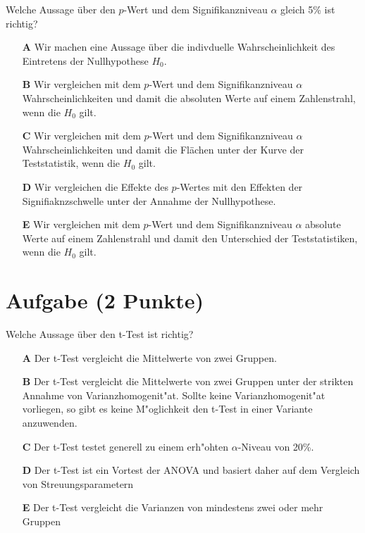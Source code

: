 \documentclass[a4paper, 10pt]{scrartcl}\usepackage[]{graphicx}\usepackage[]{color}
\begin{document}
Welche Aussage über den $p$-Wert und dem Signifikanzniveau $\alpha$ gleich 5\% ist richtig?



\begin{enumerate}
\item [\textbf{A} \msquare] Wir machen eine Aussage über die indivduelle Wahrscheinlichkeit des Eintretens der Nullhypothese $H_0$.
\item [\textbf{B} \msquare] Wir vergleichen mit dem $p$-Wert und dem Signifikanzniveau $\alpha$ Wahrscheinlichkeiten und damit die absoluten Werte auf einem Zahlenstrahl, wenn die $H_0$ gilt.
\item [\textbf{C} \msquare] Wir vergleichen mit dem $p$-Wert und dem Signifikanzniveau $\alpha$ Wahrscheinlichkeiten und damit die Flächen unter der Kurve der Teststatistik, wenn die $H_0$ gilt.
\item [\textbf{D} \msquare] Wir vergleichen die Effekte des $p$-Wertes mit den Effekten der Signifiaknzschwelle unter der Annahme der Nullhypothese.
\item [\textbf{E} \msquare] Wir vergleichen mit dem $p$-Wert und dem Signifikanzniveau $\alpha$ absolute Werte auf einem Zahlenstrahl und damit den Unterschied der Teststatistiken, wenn die $H_0$ gilt.
\end{enumerate}

\section{Aufgabe \hfill (2 Punkte)}

Welche Aussage {\"u}ber den t-Test ist richtig?



\begin{enumerate}
\item [\textbf{A} \msquare] Der t-Test vergleicht die Mittelwerte von zwei Gruppen.
\item [\textbf{B} \msquare] Der t-Test vergleicht die Mittelwerte von zwei Gruppen unter der strikten Annahme von Varianzhomogenit{"a}t. Sollte keine Varianzhomogenit{"a}t vorliegen, so gibt es keine M{"o}glichkeit den t-Test in einer Variante anzuwenden.
\item [\textbf{C} \msquare] Der t-Test testet generell zu einem erh{"o}hten $\alpha$-Niveau von 20\%.
\item [\textbf{D} \msquare] Der t-Test ist ein Vortest der ANOVA und basiert daher auf dem Vergleich von Streuungsparametern
\item [\textbf{E} \msquare] Der t-Test vergleicht die Varianzen von mindestens zwei oder mehr Gruppen
\end{enumerate}    
\end{document}
